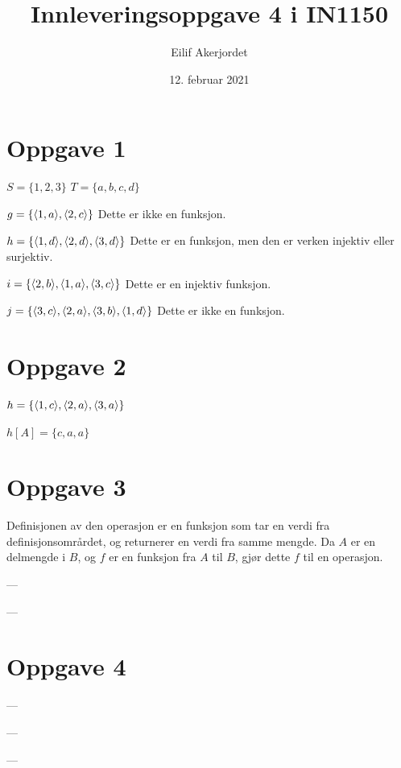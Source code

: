 \documentclass{in1150-innlevering}
\title{Innleveringsoppgave 4 i IN1150}
\author{Eilif Akerjordet}
\date{12. februar 2021}
\begin{document}
\maketitle

\section*{Oppgave 1}
  $S=\{1,2,3\}$
  $T=\{a,b,c,d\}$
\begin{deloppgaver}
  \item
    $g=\{\langle 1,a \rangle,\langle 2,c \rangle\}$
    Dette er ikke en funksjon.
  \item
    $h=\{\langle 1,d \rangle,\langle 2,d \rangle,\langle 3,d \rangle\}$ Dette er en funksjon, men den er verken injektiv eller surjektiv.
  \item
    $i=\{\langle 2,b \rangle,\langle 1,a \rangle,\langle 3,c \rangle\}$ Dette er en injektiv funksjon.
  \item
    $j=\{\langle 3,c \rangle,\langle 2,a \rangle,\langle 3,b \rangle,\langle 1,d \rangle\}$ Dette er ikke en funksjon.
\end{deloppgaver}

\section*{Oppgave 2}
\begin{deloppgaver}
\item $h=\{\langle 1,c \rangle,\langle 2,a \rangle,\langle 3,a \rangle\}$
\item $h[A]=\{c, a, a\}$
\end{deloppgaver}

\section*{Oppgave 3}
\begin{deloppgaver}
\item 
  Definisjonen av den operasjon er en funksjon som tar en verdi fra definisjonsområrdet, og returnerer en verdi fra samme mengde. Da $A$ er en delmengde i $B$, og $f$ er en funksjon fra $A$ til $B$, gjør dette $f$ til en operasjon.
\item ---
\item ---
\end{deloppgaver}

\section*{Oppgave 4}
\begin{deloppgaver}
\item ---
\item ---
\item ---
\end{deloppgaver}
\end{document}
